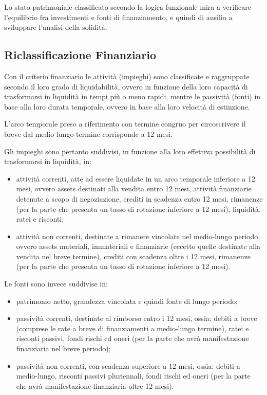 Lo stato patrimoniale classificato secondo la logica funzionale mira a verificare l’equilibrio fra investimenti e fonti di finanziamento, e quindi di ausilio a sviluppare l’analisi della solidità.


\subsection{Riclassificazione Finanziario}

Con il criterio finanziario le attività (impieghi) sono classificate e raggruppate secondo il loro grado di liquidabilità, ovvero in funzione della loro capacità di trasformarsi in liquidità in tempi più o meno rapidi, mentre le passività (fonti) in base alla loro durata temporale, ovvero in base alla loro velocità di estinzione.

L’arco temporale preso a riferimento con termine congruo per circoscrivere il breve dal medio-lungo termine corrisponde a 12 mesi.

Gli impieghi sono pertanto suddivisi, in funzione alla loro effettiva possibilità di trasformarsi in liquidità, in:
\begin{itemize}
 \item attività correnti, atte ad essere liquidate in un arco temporale inferiore a 12 mesi, ovvero assets destinati alla vendita entro 12 mesi, attività finanziarie detenute a scopo di negoziazione, crediti in scadenza entro 12 mesi, rimanenze (per la parte che presenta un tasso di rotazione inferiore a 12 mesi), liquidità, ratei e risconti;
 \item attività non correnti, destinate a rimanere vincolate nel medio-lungo periodo, ovvero assets materiali, immateriali e finanziarie (eccetto quelle destinate alla vendita nel breve termine), crediti con scadenza oltre i 12 mesi, rimanenze (per la parte che presenta un tasso di rotazione inferiore a 12 mesi).
\end{itemize}

Le fonti sono invece suddivise in:
\begin{itemize}
 \item patrimonio netto, grandezza vincolata e quindi fonte di lungo periodo;
 \item passività correnti, destinate al rimborso entro i 12 mesi, ossia: debiti a breve (comprese le rate a breve di finanziamenti a medio-lungo termine), ratei e risconti passivi, fondi rischi ed oneri (per la parte che avrà manifestazione finanziaria nel breve periodo);
 \item passività non correnti, con scadenza superiore a 12 mesi, ossia: debiti a medio-lungo, risconti passivi pluriennali, fondi rischi ed oneri (per la parte che avrà manifestazione finanziaria oltre 12 mesi).
\end{itemize}

